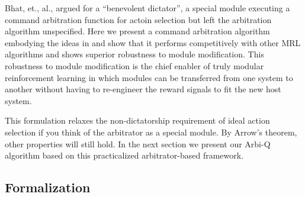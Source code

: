 Bhat, et., al., \cite{bhat2006on-the-difficulty} argued for a ``benevolent dictator'', a special module executing a command arbitration function for actoin selection but left the arbitration algorithm unspecified. Here we present a command arbitration algorithm embodying the ideas in \cite{bhat2006on-the-difficulty} and show that it performs competitively with other MRL algorithms and shows superior robustness to module modification.  This robustness to module modification is the chief enabler of truly modular reinforcement learning in which modules can be transferred from one system to another without having to re-engineer the reward signals to fit the new host system.

This formulation relaxes the non-dictatorship requirement of ideal action selection if you think of the arbitrator as a special module.  By Arrow's theorem, other properties will still hold. In the next section we present our Arbi-Q algorithm based on this practicalized arbitrator-based framework.




\subsection{Formalization}

